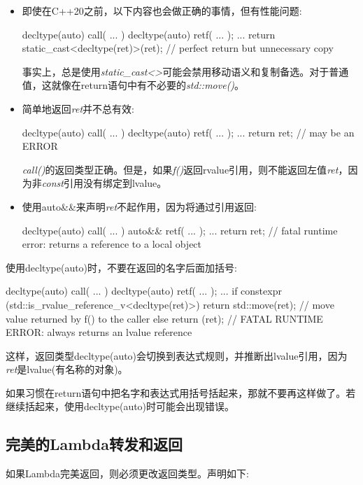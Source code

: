 \begin{itemize}
	\item 即使在C++20之前，以下内容也会做正确的事情，但有性能问题:

\begin{cppcode}
decltype(auto) call( ... )
{
	decltype(auto) ret{f( ... )};
	...
	return static_cast<decltype(ret)>(ret); // perfect return but unnecessary copy
}
\end{cppcode}
事实上，总是使用\textit{static_cast<>}可能会禁用移动语义和复制备选。对于普通值，这就像在return语句中有不必要的\textit{std::move()}。
\item 简单地返回\textit{ret}并不总有效:
\begin{cppcode}
decltype(auto) call( ... )
{
	decltype(auto) ret{f( ... )};
	...
	return ret; // may be an ERROR
}
\end{cppcode}
\textit{call()}的返回类型正确。但是，如果\textit{f()}返回rvalue引用，则不能返回左值\textit{ret}，因为非\textit{const}引用没有绑定到lvalue。
\item 使用auto\&\&来声明\textit{ret}不起作用，因为将通过引用返回:
\begin{cppcode}
decltype(auto) call( ... )
{
	auto&& ret{f( ... )};
	...
	return ret; // fatal runtime error: returns a reference to a local object
}
\end{cppcode}
\end{itemize}

使用decltype(auto)时，不要在返回的名字后面加括号:

\begin{cppcode}
decltype(auto) call( ... )
{
	decltype(auto) ret{f( ... )};
	...
	if constexpr (std::is_rvalue_reference_v<decltype(ret)>) {
		return std::move(ret); // move value returned by f() to the caller
	}
	else {
		return (ret); // FATAL RUNTIME ERROR: always returns an lvalue reference
	}
}
\end{cppcode}

这样，返回类型decltype(auto)会切换到表达式规则，并推断出lvalue引用，因为\textit{ret}是lvalue(有名称的对象)。

如果习惯在return语句中把名字和表达式用括号括起来，那就不要再这样做了。若继续括起来，使用decltype(auto)时可能会出现错误。

\subsection{完美的Lambda转发和返回}

如果Lambda完美返回，则必须更改返回类型。声明如下:

